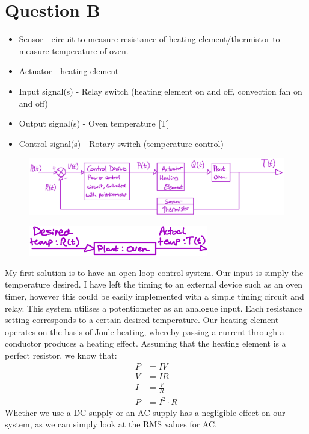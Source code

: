 \documentclass[12pt]{article}
\numberwithin{equation}{section}
\begin{document}
\section{Question B}
\begin{itemize}
  \item Sensor - circuit to measure resistance of heating element/thermistor to measure temperature of oven.
  \item Actuator - heating element
  \item Input signal(s) - Relay switch (heating element on and off, convection fan on and off)
  \item Output signal(s) - Oven temperature [T]
  \item Control signal(s) - Rotary switch (temperature control)
\end{itemize}
\begin{figure}[H]
  \centering
  \includegraphics[width=\textwidth]{./img/2-1blockdiagram.png}
\end{figure}
\begin{figure}[H]
  \centering
  \includegraphics[width=0.7\textwidth]{./img/2-5timedomain.png}
\end{figure}
My first solution is to have an open-loop control system. Our input is simply the temperature desired. I have left the timing to an external device such as an oven timer, however this could be easily implemented with a simple timing circuit and relay. This system utilises a potentiometer as an analogue input. Each resistance setting corresponds to a certain desired temperature. Our heating element operates on the basis of Joule heating, whereby passing a current through a conductor produces a heating effect. Assuming that the heating element is a perfect resistor, we know that:
\begin{align}
  P &= IV\\
  V &= IR\\
  I &= \frac{V}{R}\\
  P &= I^2 \cdot R
\end{align}
Whether we use a DC supply or an AC supply has a negligible effect on our system, as we can simply look at the RMS values for AC. 
\end{document}
